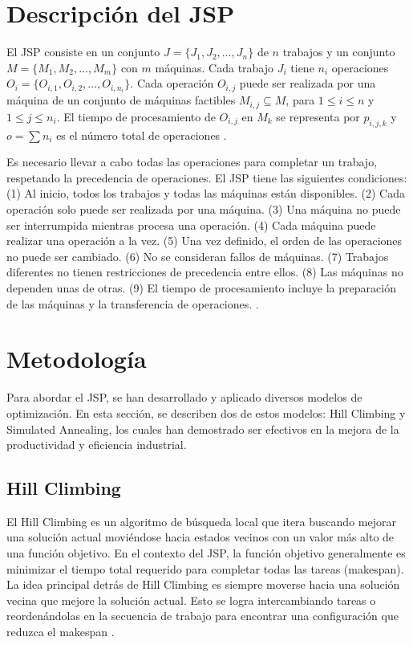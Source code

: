 \documentclass[11pt]{article}
\begin{document}
\section{Descripción del JSP}

El JSP consiste en un conjunto \( J = \{J_1, J_2, \ldots, J_n\} \) de \( n \) trabajos y un conjunto \( M = \{M_1, M_2, \ldots, M_m\} \) con \( m \) máquinas. Cada trabajo \( J_i \) tiene \( n_i \) operaciones \( O_{i} = \{O_{i,1}, O_{i,2}, \ldots, O_{i,n_i}\} \). Cada operación \( O_{i,j} \) puede ser realizada por una máquina de un conjunto de máquinas factibles \( M_{i,j} \subseteq M \), para \( 1 \leq i \leq n \) y \( 1 \leq j \leq n_i \). El tiempo de procesamiento de \( O_{i,j} \) en \( M_k \) se representa por \( p_{i,j,k} \) y \( o = \sum n_i \) es el número total de operaciones \citep{escamilla2022}.

\vspace{1em}
\noindent  Es necesario llevar a cabo todas las operaciones para completar un trabajo, respetando la precedencia de operaciones. El JSP tiene las siguientes condiciones: (1) Al inicio, todos los trabajos y todas las máquinas están disponibles. (2) Cada operación solo puede ser realizada por una máquina. (3) Una máquina no puede ser interrumpida mientras procesa una operación. (4) Cada máquina puede realizar una operación a la vez. (5) Una vez definido, el orden de las operaciones no puede ser cambiado. (6) No se consideran fallos de máquinas. (7) Trabajos diferentes no tienen restricciones de precedencia entre ellos. (8) Las máquinas no dependen unas de otras. (9) El tiempo de procesamiento incluye la preparación de las máquinas y la transferencia de operaciones. \citep{escamilla2022}.


\section{Metodología}

Para abordar el JSP, se han desarrollado y aplicado diversos modelos de optimización. En esta sección, se describen dos de estos modelos: Hill Climbing y Simulated Annealing, los cuales han demostrado ser efectivos en la mejora de la productividad y eficiencia industrial.

\subsection{Hill Climbing}
El Hill Climbing es un algoritmo de búsqueda local que itera buscando mejorar una solución actual moviéndose hacia estados vecinos con un valor más alto de una función objetivo. En el contexto del JSP, la función objetivo generalmente es minimizar el tiempo total requerido para completar todas las tareas (makespan). La idea principal detrás de Hill Climbing es siempre moverse hacia una solución vecina que mejore la solución actual. Esto se logra intercambiando tareas o reordenándolas en la secuencia de trabajo para encontrar una configuración que reduzca el makespan \citep{chatgpt}.
\end{document}
